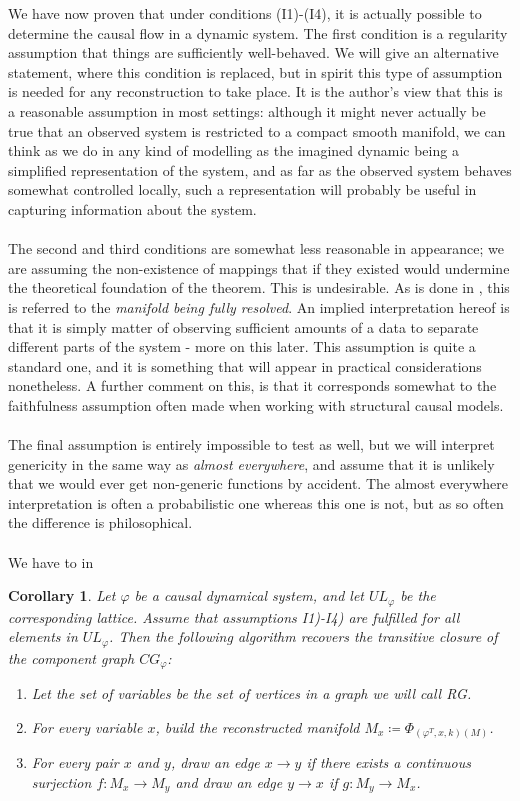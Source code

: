 \documentclass[11pt, a4paper]{memoir}
\theoremstyle{break}
\newtheorem{cor}{Corollary}
\theoremstyle{break}
\theoremstyle{nonumberplain}
\begin{document}
We have now proven that under conditions (I1)-(I4), it is actually possible to determine the causal flow in a dynamic system. The first condition is a regularity assumption that things are sufficiently well-behaved. We will give an alternative statement, where this condition is replaced, but in spirit this type of assumption is needed for any reconstruction to take place. It is the author's view that this is a reasonable assumption in most settings: although it might never actually be true that an observed system is restricted to a compact smooth manifold, we can think as we do in any kind of modelling as the imagined dynamic being a simplified representation of the system, and as far as the observed system behaves somewhat controlled locally, such a representation will probably be useful in capturing information about the system.\\\\ The second and third conditions are somewhat less reasonable in appearance; we are assuming the non-existence of mappings that if they existed would undermine the theoretical foundation of the theorem. This is undesirable. As is done in \cite{mathFound}, this is referred to the \textit{manifold being fully resolved}. An implied interpretation hereof is that it is simply matter of observing sufficient amounts of a data to separate different parts of the system - more on this later. This assumption is quite a standard one, and it is something that will appear in practical considerations nonetheless. A further comment on this, is that it corresponds somewhat to the faithfulness assumption often made when working with structural causal models.\\\\ The final assumption is entirely impossible to test as well, but we will interpret genericity in the same way as \textit{almost everywhere}, and assume that it is unlikely that we would ever get non-generic functions by accident. The almost everywhere interpretation is often a probabilistic one whereas this one is not, but as so often the difference is philosophical.\\\\
We have to in
\begin{cor}
Let $\varphi$ be a causal dynamical system, and let $UL_\varphi$ be the corresponding lattice. Assume that assumptions I1)-I4) are fulfilled for all elements in $UL_\varphi$. Then the following algorithm recovers the transitive closure of the component graph $CG_\varphi$:
\begin{enumerate}[label=\roman*.]
	\item Let the set of variables be the set of vertices in a graph we will call \emph{RG}.
	\item For every variable $x$, build the reconstructed manifold $M_x\coloneqq \Phi	_{(\varphi^T,x,k)(M)}$.
	\item For every pair $x$ and $y$, draw an edge $x\to y$ if there exists a continuous surjection $f:M_x\to M_y$ and draw an edge $y\to x$ if $g:M_y\to M_x$.
\end{enumerate}
\end{cor}
\end{document}
